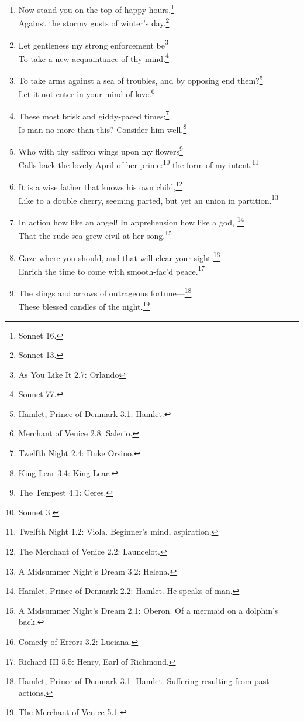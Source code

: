 \documentclass[17pt,twoside]{extarticle}
\begin{document}
\begin{enumerate}
  so.\footnote{Henry V 4.3: King Henry}
\item
  Now stand you on the top of happy hours,\footnote{Sonnet 16.}\\Against
  the stormy gusts of winter's day.\footnote{Sonnet 13.}
\item
  Let gentleness my strong enforcement be\footnote{As You Like It 2.7:
    Orlando}\\To take a new acquaintance of thy mind.\footnote{Sonnet
    77.}
\item
  To take arms against a sea of troubles, and by opposing end
  them?\footnote{Hamlet, Prince of Denmark 3.1: Hamlet.}\\Let it not
  enter in your mind of love.\footnote{Merchant of Venice 2.8: Salerio.}
\item
  These most brisk and giddy-paced times:\footnote{Twelfth Night 2.4:
    Duke Orsino.}\\Is man no more than this? Consider him
  well.\footnote{King Lear 3.4: King Lear.}
\item
  Who with thy saffron wings upon my flowers\footnote{The Tempest 4.1:
    Ceres.}\\Calls back the lovely April of her prime:\footnote{Sonnet
    3.} the form of my intent.\footnote{Twelfth Night 1.2: Viola.
    Beginner's mind, aspiration.}
\item
  It is a wise father that knows his own child,\footnote{The Merchant of
    Venice 2.2: Launcelot.}\\Like to a double cherry, seeming parted,
  but yet an union in partition.\footnote{A Midsummer Night's Dream 3.2:
    Helena.}
\item
  In action how like an angel! In apprehension how like a god,
  \footnote{Hamlet, Prince of Denmark 2.2: Hamlet. He speaks of man.}\\That
  the rude sea grew civil at her song.\footnote{A Midsummer Night's
    Dream 2.1: Oberon. Of a mermaid on a dolphin's back.}
\item
  Gaze where you should, and that will clear your sight.\footnote{Comedy
    of Errors 3.2: Luciana.}\\Enrich the time to come with smooth-fac'd
  peace.\footnote{Richard III 5.5: Henry, Earl of Richmond.}
\item
  The slings and arrows of outrageous fortune---\footnote{Hamlet, Prince
    of Denmark 3.1: Hamlet. Suffering resulting from past actions.}\\These
  blessed candles of the night.\footnote{The Merchant of Venice 5.1:
}
\end{enumerate}
\end{document}
